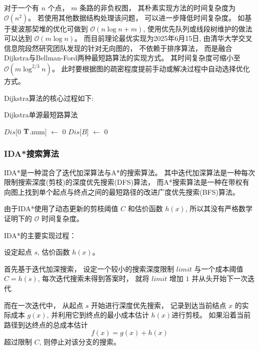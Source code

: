 \documentclass[oneside,UTF8]{ctexart}
\numberwithin{figure}{section} %
\begin{document}
对于一个有 $n$ 个点，
$m$ 条路的非负权图，
其朴素实现方法的时间复杂度为 $\mathcal{O}(n^2)$。
若使用其他数据结构处理该问题，
可以进一步降低时间复杂度。
如基于斐波那契堆的优化可做到 $\mathcal{O}(n \log n + m)$,
使用优先队列或线段树维护的做法可以达到 $\mathcal{O}(m \log n)$。
而目前理论最优实现为2025年6月15日,
由清华大学交叉信息院段然研究团队发现的针对无向图的，
不依赖于排序算法，
而是融合Dijkstra与Bellman-Ford两种最短路算法的实现方式。
其时间复杂度可缩小至 $\mathcal{O}(m \log ^{2/3} n)$\textsuperscript{\cite{ref5}}。
此时要根据图的疏密程度提前手动或解决过程中自动选择优化方式。

Dijkstra算法的核心过程如下:

\begin{algorithm}[H]
  \caption{Dijkstra单源最短路算法}\label{algorithm-traditional-Dijkstra}

  $Dis$[$0$ \KwTo $\bf{T}$.num] $\leftarrow$ 0\;
  $Dis$[$B$] $\leftarrow$ 0\;
\end{algorithm}

\subsubsection{IDA*搜索算法}
IDA*是一种混合了迭代加深算法与A*的搜索算法。
其中迭代加深算法是一种每次限制搜索深度(剪枝)的深度优先搜索(DFS)算法，
而A*搜索算法是一种在带权有向图上找到单个起点与终点之间的最短路径的改进广度优先搜索(BFS)算法。

由于IDA*使用了动态更新的剪枝阈值 $C$ 和估价函数 $h(x)$,
所以其没有严格数学证明下的 $\mathcal{O}$ 时间复杂度。

IDA*的主要实现过程：

设定起点 $s$,
估价函数 $h(x)$。

首先基于迭代加深搜索，
设定一个较小的搜索深度限制 $limit$ 与一个成本阈值 $C = h(s)$,
每次迭代搜索未得到答案时，
就将 $limit$ 增加 $1$ 并从头开始下一次迭代.

而在一次迭代中，
从起点 $s$ 开始进行深度优先搜索，
记录到达当前结点 $x$ 的实际成本 $g(x)$,
并利用它到终点的最小成本估计 $h(x)$进行剪枝。
如果沿着当前路径到达终点的总成本估计 
\[
  f(x) = g(x) +  h(x)
\]
超过限制 $C$,
则停止对该分支的搜索。
\end{document}
